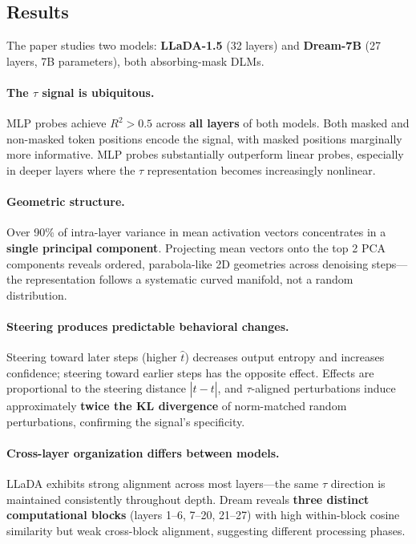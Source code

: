 \documentclass[11pt,a4paper]{article}
\begin{document}
\subsection{Results}

The paper studies two models: \textbf{LLaDA-1.5} (32 layers) and \textbf{Dream-7B} (27 layers, 7B parameters), both absorbing-mask DLMs.

\paragraph{The $\tau$ signal is ubiquitous.}
MLP probes achieve $R^2 > 0.5$ across \textbf{all layers} of both models. Both masked and non-masked token positions encode the signal, with masked positions marginally more informative. MLP probes substantially outperform linear probes, especially in deeper layers where the $\tau$ representation becomes increasingly nonlinear.

\paragraph{Geometric structure.}
Over 90\% of intra-layer variance in mean activation vectors concentrates in a \textbf{single principal component}. Projecting mean vectors onto the top 2 PCA components reveals ordered, parabola-like 2D geometries across denoising steps---the representation follows a systematic curved manifold, not a random distribution.

\paragraph{Steering produces predictable behavioral changes.}
Steering toward later steps (higher $\hat{t}$) decreases output entropy and increases confidence; steering toward earlier steps has the opposite effect. Effects are proportional to the steering distance $|\hat{t} - t|$, and $\tau$-aligned perturbations induce approximately \textbf{twice the KL divergence} of norm-matched random perturbations, confirming the signal's specificity.

\paragraph{Cross-layer organization differs between models.}
LLaDA exhibits strong alignment across most layers---the same $\tau$ direction is maintained consistently throughout depth. Dream reveals \textbf{three distinct computational blocks} (layers 1--6, 7--20, 21--27) with high within-block cosine similarity but weak cross-block alignment, suggesting different processing phases.
\end{document}
